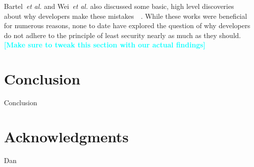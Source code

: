 \documentclass{sig-alternate}
\newcommand{\todo}[1]{\textcolor{cyan}{\textbf{[#1]}}}
\begin{document}
Bartel~\emph{et al.} and Wei~\emph{et al.} also discussed some basic, high level discoveries about why developers make these mistakes~\cite{Bartel:2012:ASP:2351676.2351722}~\cite{Wei:2012:PEA:2420950.2420956}. While these works were beneficial for numerous reasons, none to date have explored the question of why developers do not adhere to the principle of least security nearly as much as they should.
\todo{Make sure to tweak this section with our actual findings}








\section{Conclusion}
\label{sec: conclusion}

Conclusion



\section{Acknowledgments}
Dan





\end{document}
